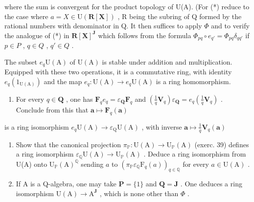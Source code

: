 where the sum is convergent for the product topology of U(A). (For (*) reduce to the case where \(a = X \in \mathrm{U}(\mathbf{R}[\mathbf{X}])\) , R being the subring of Q formed by the rational numbers with denominator in Q. It then suffices to apply \(\Phi\) and to verify the analogue of (*) in \(\mathbf{R}[\mathbf{X}]^{\mathbf{J}}\) which follows from the formula \(\Phi_{pq} \circ e_{q'} = \Phi_{pq} \delta_{qq'}\) if \(p \in P\) , \(q \in Q\) , \(q' \in Q\) .

The subset \(e_q \mathrm{U(A)}\) of \(\mathrm{U(A)}\) is stable under addition and multiplication. Equipped with these two operations, it is a commutative ring, with identity \(e_q(1_{\mathrm{U(A)}})\) and the map \(e_q: \mathrm{U(A)} \to e_q \mathrm{U(A)}\) is a ring homomorphism.

\begin{enumerate}
\def\labelenumi{\alph{enumi})}
\setcounter{enumi}{4}
\tightlist
\item
  For every \(q \in \mathbf{Q}\) , one has \(\mathbf{F}_q e_q = \varepsilon_{\mathbf{Q}} \mathbf{F}_q\) and \(\left(\frac{1}{q} \mathbf{V}_q\right) \varepsilon_{\mathbf{Q}} = e_q \left(\frac{1}{q} \mathbf{V}_q\right)\) . Conclude from this that \(\boldsymbol{a} \mapsto \mathbf{F}_q(\boldsymbol{a})\)
\end{enumerate}

is a ring isomorphism \(e_q\mathrm{U(A)}\to \varepsilon_{\mathrm{Q}}\mathrm{U(A)}\) , with inverse \(\pmb {a}\mapsto \frac{1}{q}\mathbf{V}_q(\pmb {a})\)

\begin{enumerate}
\def\labelenumi{\alph{enumi})}
\setcounter{enumi}{5}
\item
  Show that the canonical projection \(\pi_{\mathbb{P}}: \mathrm{U}(\mathrm{A}) \to \mathrm{U}_{\mathbb{P}}(\mathrm{A})\) (exerc. 39) defines a ring isomorphism \(\varepsilon_{\mathbb{Q}} \mathrm{U}(\mathrm{A}) \to \mathrm{U}_{\mathbb{P}}(\mathrm{A})\) . Deduce a ring isomorphism from U(A) onto \(\mathrm{U}_{\mathbb{P}}(\mathrm{A})^{\mathbb{Q}}\) sending \(a\) to \((\pi_{\mathbb{P}} \varepsilon_{\mathbb{Q}} \mathrm{F}_{q}(a))_{q \in \mathbb{Q}}\) for every \(a \in \mathrm{U}(\mathrm{A})\) .
\item
  If A is a Q-algebra, one may take \(\mathbf{P} = \{1\}\) and \(\mathbf{Q} = \mathbf{J}\) . One deduces a ring isomorphism \(\mathrm{U}(\mathrm{A}) \to \mathrm{A}^{\mathbf{J}}\) , which is none other than \(\Phi\) .
\end{enumerate}

